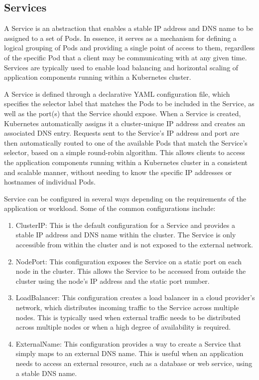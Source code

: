 \documentclass[
  11pt,
]{article}
\begin{document}
\hypertarget{services}{%
\subsection{Services}\label{services}}

A Service is an abstraction that enables a stable IP address and DNS
name to be assigned to a set of Pods. In essence, it serves as a
mechanism for defining a logical grouping of Pods and providing a single
point of access to them, regardless of the specific Pod that a client
may be communicating with at any given time. Services are typically used
to enable load balancing and horizontal scaling of application
components running within a Kubernetes cluster.

A Service is defined through a declarative YAML configuration file,
which specifies the selector label that matches the Pods to be included
in the Service, as well as the port(s) that the Service should expose.
When a Service is created, Kubernetes automatically assigns it a
cluster-unique IP address and creates an associated DNS entry. Requests
sent to the Service's IP address and port are then automatically routed
to one of the available Pods that match the Service's selector, based on
a simple round-robin algorithm. This allows clients to access the
application components running within a Kubernetes cluster in a
consistent and scalable manner, without needing to know the specific IP
addresses or hostnames of individual Pods.

Service can be configured in several ways depending on the requirements
of the application or workload. Some of the common configurations
include:

\begin{enumerate}
\def\labelenumi{\arabic{enumi}.}
\item
  ClusterIP: This is the default configuration for a Service and
  provides a stable IP address and DNS name within the cluster. The
  Service is only accessible from within the cluster and is not exposed
  to the external network.
\item
  NodePort: This configuration exposes the Service on a static port on
  each node in the cluster. This allows the Service to be accessed from
  outside the cluster using the node's IP address and the static port
  number.
\item
  LoadBalancer: This configuration creates a load balancer in a cloud
  provider's network, which distributes incoming traffic to the Service
  across multiple nodes. This is typically used when external traffic
  needs to be distributed across multiple nodes or when a high degree of
  availability is required.
\item
  ExternalName: This configuration provides a way to create a Service
  that simply maps to an external DNS name. This is useful when an
  application needs to access an external resource, such as a database
  or web service, using a stable DNS name.
\end{enumerate}
\end{document}
